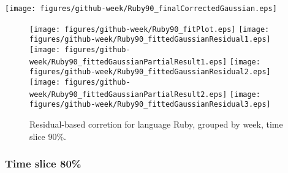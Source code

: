 \begin{center}
{\texttt{[image: figures/github-week/Ruby90\_finalCorrectedGaussian.eps]}}
\end{center}

\FloatBarrier

\begin{figure}[t]
\centering
{}
{\texttt{[image: figures/github-week/Ruby90\_fitPlot.eps]}}
{\texttt{[image: figures/github-week/Ruby90\_fittedGaussianResidual1.eps]}}
{\texttt{[image: figures/github-week/Ruby90\_fittedGaussianPartialResult1.eps]}}
{\texttt{[image: figures/github-week/Ruby90\_fittedGaussianResidual2.eps]}}
{\texttt{[image: figures/github-week/Ruby90\_fittedGaussianPartialResult2.eps]}}
{\texttt{[image: figures/github-week/Ruby90\_fittedGaussianResidual3.eps]}}
\caption{Residual-based corretion for language Ruby, grouped by week, time slice 90\%.}
\end{figure}


\FloatBarrier


\subsubsection{Time slice 80\%}

